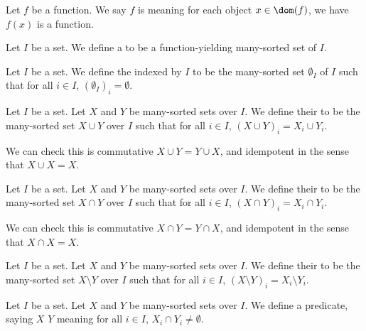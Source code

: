 \begin{definition}
Let $f$ be a function.
We say $f$ is  meaning for each object
$x\in\dom(f)$, we have $f(x)$ is a function.
\end{definition}

\begin{definition}\label{def:pboole:many-sorted-function}
Let $I$ be a set. We define a 
to be a function-yielding many-sorted set of $I$.
\end{definition}

\begin{definition}
Let $I$ be a set.
We define the  indexed by $I$ to be the
many-sorted set $\emptyset_{I}$ of $I$ such that for all $i\in I$, $(\emptyset_{I})_{i}=\emptyset$.
\end{definition}

\begin{definition}
Let $I$ be a set.
Let $X$ and $Y$ be many-sorted sets over $I$.
We define their  to be the many-sorted set $X\cup Y$
over $I$ such that for all $i\in I$, $(X\cup Y)_{i}=X_{i}\cup Y_{i}$.

We can check this is commutative $X\cup Y=Y\cup X$, and idempotent in
the sense that $X\cup X=X$.
\end{definition}

\begin{definition}
Let $I$ be a set.
Let $X$ and $Y$ be many-sorted sets over $I$.
We define their  to be the many-sorted set $X\cap Y$
over $I$ such that for all $i\in I$, $(X\cap Y)_{i}=X_{i}\cap Y_{i}$.

We can check this is commutative $X\cap Y=Y\cap X$, and idempotent in
the sense that $X\cap X=X$.
\end{definition}

\begin{definition}
Let $I$ be a set.
Let $X$ and $Y$ be many-sorted sets over $I$.
We define their  to be the many-sorted set $X\setminus Y$
over $I$ such that for all $i\in I$, $(X\setminus Y)_{i}=X_{i}\setminus Y_{i}$.
\end{definition}

\begin{definition}
Let $I$ be a set.
Let $X$ and $Y$ be many-sorted sets over $I$.
We define a predicate, saying $X$  $Y$ meaning
for all $i\in I$, $X_{i}\cap Y_{i}\neq\emptyset$.
\end{definition}

